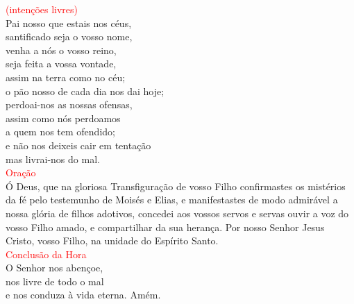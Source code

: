\documentclass{book}
\begin{document}
\begin{center}
    \textcolor{red}{\small (intenções livres)}
    \vspace{.2cm} \\
    Pai nosso que estais nos céus, \\
    santificado seja o vosso nome, \\
    venha a nós o vosso reino, \\
    seja feita a vossa vontade, \\
    assim na terra como no céu; \\
    o pão nosso de cada dia nos dai hoje; \\
    perdoai-nos as nossas ofensas, \\
    assim como nós perdoamos \\
    a quem nos tem ofendido; \\
    e não nos deixeis cair em tentação \\
    mas livrai-nos do mal.
    \vspace{.2cm} \\
    \textcolor{red}{Oração}
    \vspace{.2cm} \\
    Ó Deus, que na gloriosa Transfiguração de vosso Filho confirmastes os mistérios da fé pelo testemunho de Moisés e Elias, e manifestastes de modo admirável a nossa glória de filhos adotivos, concedei aos vossos servos e servas ouvir a voz do vosso Filho amado, e compartilhar da sua herança. Por nosso Senhor Jesus Cristo, vosso Filho, na unidade do Espírito Santo.
    \vspace{.2cm} \\
    \textcolor{red}{Conclusão da Hora}
    \vspace{.2cm} \\
    O Senhor nos abençoe, \\
    nos livre de todo o mal \\
    e nos conduza à vida eterna. Amém.
\end{center}
\end{document}
